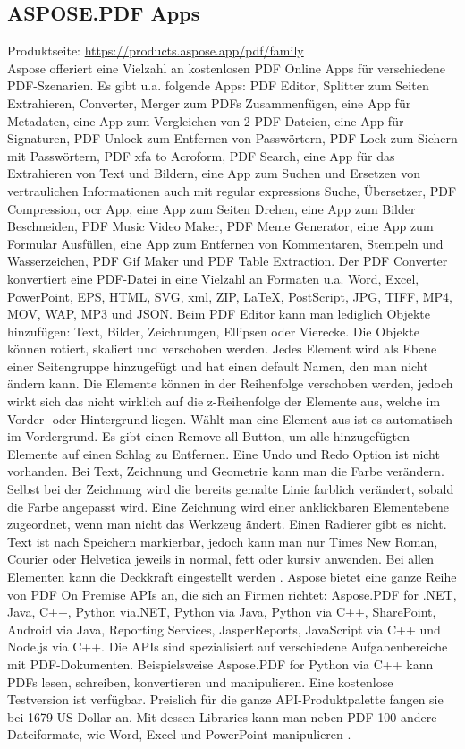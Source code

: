 \subsection{ASPOSE.PDF Apps}
Produktseite: \url{https://products.aspose.app/pdf/family} \\
Aspose offeriert eine Vielzahl an kostenlosen PDF Online Apps für verschiedene PDF-Szenarien. Es gibt u.a. folgende Apps: PDF Editor, Splitter zum Seiten Extrahieren, Converter, Merger zum PDFs Zusammenfügen, eine App für Metadaten, eine App zum Vergleichen von 2 PDF-Dateien, eine App für Signaturen, PDF Unlock zum Entfernen von Passwörtern, PDF Lock zum Sichern mit Passwörtern, PDF \gls{xfa} to Acroform, PDF Search, eine App für das Extrahieren von Text und Bildern, eine App zum Suchen und Ersetzen von vertraulichen Informationen auch mit regular expressions Suche, Übersetzer, PDF Compression, \gls{ocr} App, eine App zum Seiten Drehen, eine App zum Bilder Beschneiden, PDF Music Video Maker, PDF Meme Generator, eine App zum Formular Ausfüllen, eine App zum Entfernen von Kommentaren, Stempeln und Wasserzeichen, PDF Gif Maker und PDF Table Extraction. Der PDF Converter konvertiert eine PDF-Datei in eine Vielzahl an Formaten u.a. Word, Excel, PowerPoint, EPS, HTML, SVG, \gls{xml}, ZIP, LaTeX, PostScript, JPG, TIFF, MP4, MOV, WAP, MP3 und JSON. Beim PDF Editor kann man lediglich Objekte hinzufügen: Text, Bilder, Zeichnungen, Ellipsen oder Vierecke. Die Objekte können rotiert, skaliert und verschoben werden. Jedes Element wird als Ebene einer Seitengruppe hinzugefügt und hat einen default Namen, den man nicht ändern kann. Die Elemente können in der Reihenfolge verschoben werden, jedoch wirkt sich das nicht wirklich auf die z-Reihenfolge der Elemente aus, welche im Vorder- oder Hintergrund liegen. Wählt man eine Element aus ist es automatisch im Vordergrund. Es gibt einen Remove all Button, um alle hinzugefügten Elemente auf einen Schlag zu Entfernen. Eine Undo und Redo Option ist nicht vorhanden. Bei Text, Zeichnung und Geometrie kann man die Farbe verändern. Selbst bei der Zeichnung wird die bereits gemalte Linie farblich verändert, sobald die Farbe angepasst wird. Eine Zeichnung wird einer anklickbaren Elementebene zugeordnet, wenn man nicht das Werkzeug ändert. Einen Radierer gibt es nicht. Text ist nach Speichern markierbar, jedoch kann man nur Times New Roman, Courier oder Helvetica jeweils in normal, fett oder kursiv anwenden. Bei allen Elementen kann die Deckkraft eingestellt werden \cite{aspose-pdf}. Aspose bietet eine ganze Reihe von PDF On Premise APIs an, die sich an Firmen richtet: Aspose.PDF for .NET, Java, C++, Python via.NET, Python via Java, Python via C++, SharePoint, Android via Java, Reporting Services, JasperReports, JavaScript via C++ und Node.js via C++. Die APIs sind spezialisiert auf verschiedene Aufgabenbereiche mit PDF-Dokumenten. Beispielsweise Aspose.PDF for Python via C++ kann PDFs lesen, schreiben, konvertieren und manipulieren. Eine kostenlose Testversion ist verfügbar. Preislich für die ganze API-Produktpalette fangen sie bei 1679 US Dollar an. Mit dessen Libraries kann man neben PDF 100 andere Dateiformate, wie Word, Excel und PowerPoint manipulieren \cite{aspose-api}. 

